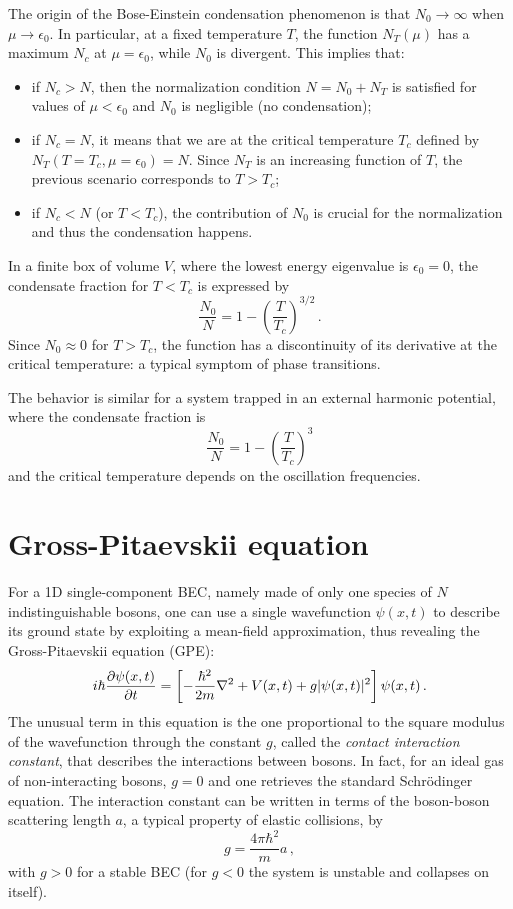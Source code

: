 The origin of the Bose-Einstein condensation phenomenon is that $N_0 \to \infty$ when $\mu \to \epsilon_0$. In particular, at a fixed temperature $T$, the function $N_T(\mu)$ has a maximum $N_c$ at $\mu = \epsilon_0$, while $N_0$ is divergent. This implies that:
\begin{itemize}
    \item if $N_c > N$, then the normalization condition $N = N_0 + N_T$ is satisfied for values of $\mu < \epsilon_0$ and $N_0$ is negligible (no condensation);
    \item if $N_c = N$, it means that we are at the critical temperature $T_c$ defined by $N_T(T = T_c, \mu = \epsilon_0) = N$. Since $N_T$ is an increasing function of $T$, the previous scenario corresponds to $T > T_c$;
    \item if $N_c < N$ (or $T < T_c$), the contribution of $N_0$ is crucial for the normalization and thus the condensation happens.
\end{itemize}
In a finite box of volume $V$, where the lowest energy eigenvalue is $\epsilon_0 = 0$, the condensate fraction for $T < T_c$ is expressed by
\begin{equation*}
    \frac{N_0}{N} = 1-\left(\frac{T}{T_c}\right)^{3/2}\, .
\end{equation*}
Since $N_0 \approx 0$ for $T > T_c$, the function has a discontinuity of its derivative at the critical temperature: a typical symptom of phase transitions.

The behavior is similar for a system trapped in an external harmonic potential, where the condensate fraction is
\begin{equation*}
    \frac{N_0}{N} = 1-\left(\frac{T}{T_c}\right)^3
\end{equation*}
and the critical temperature depends on the oscillation frequencies.

\section{Gross-Pitaevskii equation}
For a 1D single-component BEC, namely made of only one species of $N$ indistinguishable bosons, one can use a single wavefunction $\psi(x,t)$ to describe its ground state by exploiting a mean-field approximation, thus revealing the Gross-Pitaevskii equation (GPE):
\begin{equation}
    i\hbar \pdv{\psi(x,t)}{t} = \left[ 
        -\frac{\hbar^2}{2m}\nabla^2 + V(x,t) + g|\psi(x,t)|^2
    \right] \psi(x,t)\, .
\end{equation}
The unusual term in this equation is the one proportional to the square modulus of the wavefunction through the constant $g$, called the \emph{contact interaction constant}, that describes the interactions between bosons. In fact, for an ideal gas of non-interacting bosons, $g = 0$ and one retrieves the standard Schrödinger equation. The interaction constant can be written in terms of the boson-boson scattering length $a$, a typical property of elastic collisions, by
\[
    g = \frac{4\pi\hbar^2}{m}a\, ,
\]
with $g > 0$ for a stable BEC (for $g < 0$ the system is unstable and collapses on itself).

